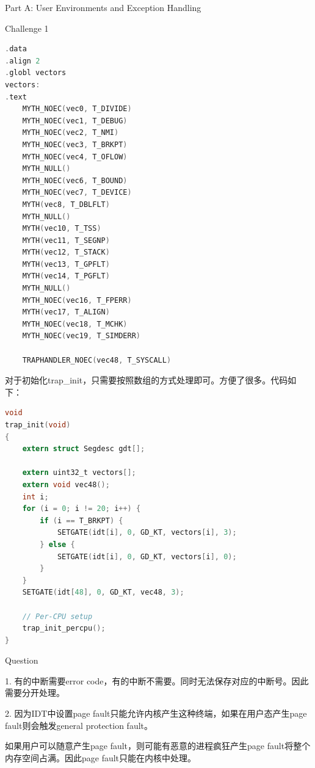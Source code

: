 \documentclass[GBK,winfonts,a4paper,10pt]{ctexart}
\begin{document}
\begin{section}{ Part A: User Environments and Exception Handling }
\begin{subsection}{ Challenge 1 }
\begin{lstlisting}[language=C]
.data
.align 2
.globl vectors
vectors:
.text
	MYTH_NOEC(vec0, T_DIVIDE)
 	MYTH_NOEC(vec1, T_DEBUG)
 	MYTH_NOEC(vec2, T_NMI)
 	MYTH_NOEC(vec3, T_BRKPT)
 	MYTH_NOEC(vec4, T_OFLOW)
 	MYTH_NULL()
 	MYTH_NOEC(vec6, T_BOUND)
	MYTH_NOEC(vec7, T_DEVICE)
 	MYTH(vec8, T_DBLFLT)
 	MYTH_NULL()
 	MYTH(vec10, T_TSS)
 	MYTH(vec11, T_SEGNP)
 	MYTH(vec12, T_STACK)
 	MYTH(vec13, T_GPFLT)
 	MYTH(vec14, T_PGFLT) 
 	MYTH_NULL()
 	MYTH_NOEC(vec16, T_FPERR)
 	MYTH(vec17, T_ALIGN)
 	MYTH_NOEC(vec18, T_MCHK)
 	MYTH_NOEC(vec19, T_SIMDERR)
  	
    TRAPHANDLER_NOEC(vec48, T_SYSCALL)
\end{lstlisting}
\par
对于初始化trap\_init，只需要按照数组的方式处理即可。方便了很多。代码如下：
\par
\begin{lstlisting}[language=C]
void
trap_init(void)
{
	extern struct Segdesc gdt[];
    
    extern uint32_t vectors[];
    extern void vec48();
    int i;
    for (i = 0; i != 20; i++) {
    	if (i == T_BRKPT) {
    		SETGATE(idt[i], 0, GD_KT, vectors[i], 3);
    	} else {
    		SETGATE(idt[i], 0, GD_KT, vectors[i], 0);
    	}
    }
    SETGATE(idt[48], 0, GD_KT, vec48, 3);

	// Per-CPU setup 
	trap_init_percpu();
}
\end{lstlisting}
\end{subsection}

\begin{subsection}{ Question }
\par
1. 有的中断需要error code，有的中断不需要。同时无法保存对应的中断号。因此需要分开处理。
\par
2. 因为IDT中设置page fault只能允许内核产生这种终端，如果在用户态产生page fault则会触发general protection fault。
\par
如果用户可以随意产生page fault，则可能有恶意的进程疯狂产生page fault将整个内存空间占满。因此page fault只能在内核中处理。
\end{subsection}
\end{section}
\end{document}
